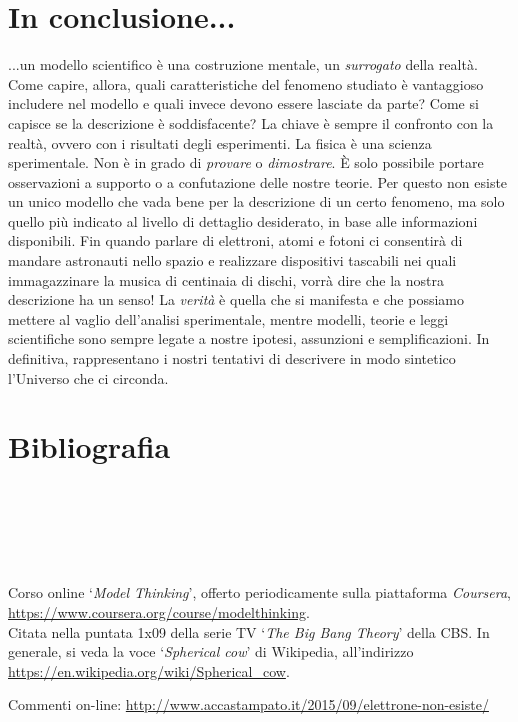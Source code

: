 \section*{In conclusione...}
...un modello scientifico è una costruzione mentale, un \emph{surrogato} della realtà. 
Come capire, allora, quali caratteristiche del fenomeno studiato è vantaggioso includere nel modello
e quali invece devono essere lasciate da parte? Come si capisce se la descrizione è soddisfacente? 
La chiave è sempre il confronto con la realtà, ovvero con i risultati degli esperimenti. La
fisica è una scienza sperimentale. Non è in grado di \emph{provare} o \emph{dimostrare}. È solo possibile
portare osservazioni a supporto o a confutazione delle nostre teorie. Per questo non esiste 
un unico modello che vada bene per la descrizione di un certo fenomeno, ma solo quello più 
indicato al livello di dettaglio desiderato, in base alle informazioni disponibili.
Fin quando parlare di elettroni, atomi e fotoni ci consentirà di mandare astronauti nello 
spazio e realizzare dispositivi tascabili nei quali immagazzinare la musica di centinaia 
di dischi, vorrà dire che la nostra descrizione ha un senso!
La \emph{verità} è quella che si manifesta e che possiamo mettere al vaglio dell'analisi sperimentale, 
mentre modelli, teorie e leggi scientifiche sono sempre legate a nostre ipotesi, assunzioni e
semplificazioni. In definitiva, rappresentano i nostri tentativi di descrivere in modo sintetico 
l'Universo che ci circonda.

\section*{Bibliografia}
\\
\\
\\
\\
\\
Corso online `\textsl{Model Thinking}', offerto periodicamente sulla piattaforma \textsl{Coursera}, \url{https://www.coursera.org/course/modelthinking}.\\
Citata nella puntata 1x09 della serie TV `\textsl{The Big Bang Theory}' della CBS. In generale, si veda la voce `\textsl{Spherical cow}' di Wikipedia, all'indirizzo \url{https://en.wikipedia.org/wiki/Spherical_cow}.

\smallskip
Commenti on-line: \url{http://www.accastampato.it/2015/09/elettrone-non-esiste/}
